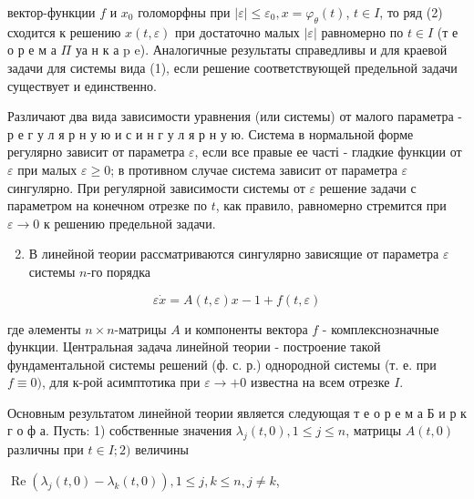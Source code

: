 \documentclass[10pt]{article}
\begin{document}
вектор-функции $f$ и $x_{0}$ голоморфны при $|\varepsilon| \leqslant \varepsilon_{0}, x=\varphi_{\theta}(t)$, $t \in I$, то ряд (2) сходится к решению $x(t, \varepsilon)$ при достаточно малых $|\varepsilon|$ равномерно по $t \in I$ (т е о р е м а $\Pi$ уа н к а p e). Аналогичные результаты справедливы и для краевой задачи для системы вида (1), если решение соответствующей предельной задачи существует и единственно.



Различают два вида зависимости уравнения (или системы) от малого параметра - р е г у л я р н у ю и с и н г у л я р н у ю. Система в нормальной форме регулярно зависит от параметра $\varepsilon$, если все правые ее часті - гладкие функции от $\varepsilon$ при малых $\varepsilon \geqslant 0$; в противном случае система зависит от параметра $\varepsilon$ сингулярно. При регулярной зависимости системы от $\varepsilon$ решение задачи с параметром на конечном отрезке по $t$, как правило, равномерно стремится при $\varepsilon \rightarrow 0$ к решению предельной задачи.



\begin{enumerate}

  \setcounter{enumi}{1}

  \item В линейной теории рассматриваются сингулярно зависящие от параметра $\varepsilon$ системы $n$-го порядка

\end{enumerate}



\[

\varepsilon \dot{x}=A(t, \varepsilon) x-1+f(t, \varepsilon)

\]



где әлементы $n \times n$-матрицы $A$ и компоненты вектора $f$ - комплекснозначные функции. Центральная задача линейной теории - построение такой фундаментальной системы решений (ф. с. р.) однородной системы (т. е. при $f \equiv 0)$, для к-рой асимптотика при $\varepsilon \rightarrow+0$ известна на всем отрезке $I$.



Основным результатом линейной теории является следующая т е о р е м а Б и р к г о ф а. Пусть: 1) собственные значения $\lambda_{j}(t, 0), 1 \leqslant j \leqslant n$, матрицы $A(t, 0)$ различны при $t \in I ; 2)$ величины



$\operatorname{Re}\left(\lambda_{j}(t, 0)-\lambda_{k}(t, 0)\right), 1 \leqslant j, k \leqslant n, j \neq k$,
\end{document}
